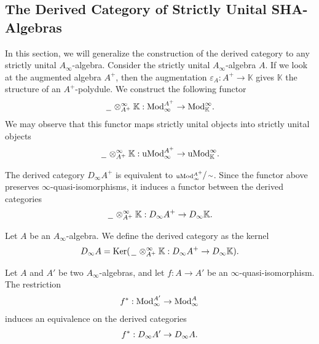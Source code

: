 \documentclass[../thesis.tex]{subfiles}
\begin{document}
        \subsection{The Derived Category of Strictly Unital SHA-Algebras}

            In this section, we will generalize the construction of the derived category to any strictly unital $A_\infty$-algebra. Consider the strictly unital $A_\infty$-algebra $A$. If we look at the augmented algebra $A^+$, then the augmentation $\varepsilon_A: A^+ \rightarrow \mathbb{K}$ gives $\mathbb{K}$ the structure of an $A^+$-polydule. We construct the following functor
            \begin{align*}
                \argument\otimes_{A^+}^\infty\mathbb{K} : \tt{Mod}_\infty^{A^+} \rightarrow \tt{Mod}_\mathbb{K}^\infty\tt{.}
            \end{align*}
            We may observe that this functor maps strictly unital objects into strictly unital objects
            \begin{align*}
                \argument\otimes_{A^+}^\infty\mathbb{K} : \tt{uMod}_\infty^{A^+} \rightarrow \tt{uMod}_\mathbb{K}^\infty\tt{.}
            \end{align*}

            The derived category $D_\infty A^+$ is equivalent to $\sfrac{\tt{uMod}_\infty^{A^+}}{\sim}$. Since the functor above preserves $\infty$-quasi-isomorphisms, it induces a functor between the derived categories
            \begin{align*}
                \argument\otimes_{A^+}^\infty\mathbb{K} : D_\infty A^+ \rightarrow D_\infty \mathbb{K}\tt{.}
            \end{align*}

            \begin{definition}
                Let $A$ be an $A_\infty$-algebra. We define the derived category as the kernel
                \begin{align*}
                    D_\infty A = \tt{Ker}(\argument\otimes_{A^+}^\infty\mathbb{K} : D_\infty A^+ \rightarrow D_\infty\mathbb{K})\tt{.}
                \end{align*}
            \end{definition}

            \begin{thm}\label{thm: derived-is-well-defined}
                Let $A$ and $A'$ be two $A_\infty$-algebras, and let $f : A \rightarrow A'$ be an $\infty$-quasi-isomorphism. The restriction
                \begin{align*}
                    f^* : \tt{Mod}_\infty^{A'} \rightarrow \tt{Mod}_\infty^{A}
                \end{align*}
                induces an equivalence on the derived categories
                \begin{align*}
                    f^* : D_\infty A' \rightarrow D_\infty A\tt{.}
                \end{align*}
            \end{thm}
\end{document}
